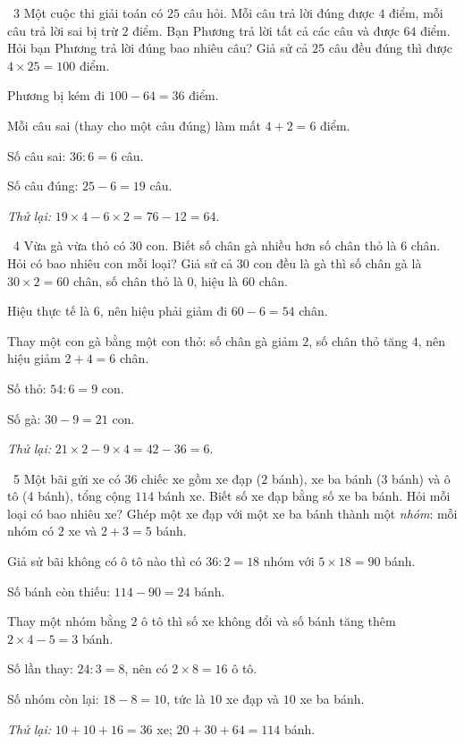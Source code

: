 \gap
\begin{exbox}{\ExWord\ 3}
Một cuộc thi giải toán có $25$ câu hỏi. Mỗi câu trả lời đúng được $4$ điểm, mỗi câu trả lời sai bị trừ $2$ điểm. Bạn Phương trả lời tất cả các câu và được $64$ điểm. Hỏi bạn Phương trả lời đúng bao nhiêu câu?
\guide
Giả sử cả $25$ câu đều đúng thì được $4\times25=100$ điểm.\par
Phương bị kém đi $100-64=36$ điểm.\par
Mỗi câu sai (thay cho một câu đúng) làm mất $4+2=6$ điểm.\par
Số câu sai: $36:6=6$ câu.\par Số câu đúng: $25-6=19$ câu.\par
\emph{Thử lại:} $19\times4-6\times2=76-12=64$.
\end{exbox}
\gap
\begin{exbox}{\ExWord\ 4}
Vừa gà vừa thỏ có $30$ con. Biết số chân gà nhiều hơn số chân thỏ là $6$ chân. Hỏi có bao nhiêu con mỗi loại?
\guide
Giả sử cả $30$ con đều là gà thì số chân gà là $30\times2=60$ chân, số chân thỏ là $0$, hiệu là $60$ chân.\par
Hiệu thực tế là $6$, nên hiệu phải giảm đi $60-6=54$ chân.\par
Thay một con gà bằng một con thỏ: số chân gà giảm $2$, số chân thỏ tăng $4$, nên hiệu giảm $2+4=6$ chân.\par
Số thỏ: $54:6=9$ con.\par Số gà: $30-9=21$ con.\par
\emph{Thử lại:} $21\times2-9\times4=42-36=6$.
\end{exbox}
\gap
\begin{exbox}{\ExWord\ 5}
Một bãi gửi xe có $36$ chiếc xe gồm xe đạp ($2$ bánh), xe ba bánh ($3$ bánh) và ô tô ($4$ bánh), tổng cộng $114$ bánh xe. Biết số xe đạp bằng số xe ba bánh. Hỏi mỗi loại có bao nhiêu xe?
\guide
Ghép một xe đạp với một xe ba bánh thành một \emph{nhóm}: mỗi nhóm có $2$ xe và $2+3=5$ bánh.\par
Giả sử bãi không có ô tô nào thì có $36:2=18$ nhóm với $5\times18=90$ bánh.\par
Số bánh còn thiếu: $114-90=24$ bánh.\par
Thay một nhóm bằng $2$ ô tô thì số xe không đổi và số bánh tăng thêm $2\times4-5=3$ bánh.\par
Số lần thay: $24:3=8$, nên có $2\times8=16$ ô tô.\par
Số nhóm còn lại: $18-8=10$, tức là $10$ xe đạp và $10$ xe ba bánh.\par
\emph{Thử lại:} $10+10+16=36$ xe; $20+30+64=114$ bánh.
\end{exbox}
